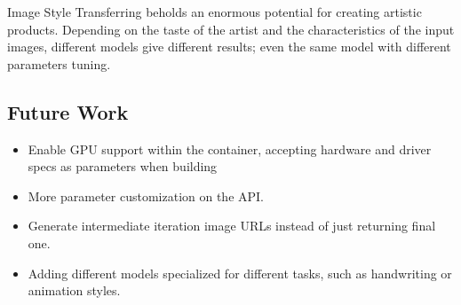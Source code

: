 Image Style Transferring beholds an enormous potential for creating artistic products.
Depending on the taste of the artist and the characteristics of the input images,
different models give different results; even the same model with different parameters tuning.

\subsection*{Future Work}
\begin{itemize}
    \item Enable GPU support within the container, accepting hardware and driver specs as parameters when building
    \item More parameter customization on the API.
    \item Generate intermediate iteration image URLs instead of just returning final one.
    \item Adding different models specialized for different tasks, such as handwriting or animation styles.
\end{itemize}
